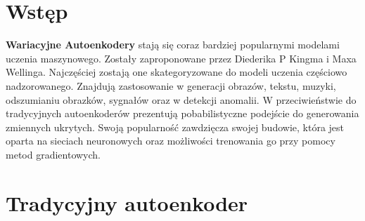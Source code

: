 \documentclass[a4paper,12pt]{book} %
\begin{document}
\sloppy



\thispagestyle{empty}




\thispagestyle{empty}

\tableofcontents{}

\chapter*{Wstęp} %
\textbf{Wariacyjne Autoenkodery} stają się coraz bardziej popularnymi modelami uczenia maszynowego. Zostały zaproponowane przez Diederika P Kingma i Maxa Wellinga. Najczęściej zostają one skategoryzowane do modeli uczenia częściowo nadzorowanego. Znajdują zastosowanie w generacji obrazów, tekstu, muzyki, odszumianiu obrazków, sygnałów oraz w detekcji anomalii. W przeciwieństwie do tradycyjnych autoenkoderów prezentują pobabilistyczne podejście do generowania zmiennych ukrytych. Swoją popularność zawdzięcza swojej budowie, która jest oparta na sieciach neuronowych oraz możliwości trenowania go przy pomocy metod gradientowych.
\chapter{Tradycyjny autoenkoder} 
\end{document}

